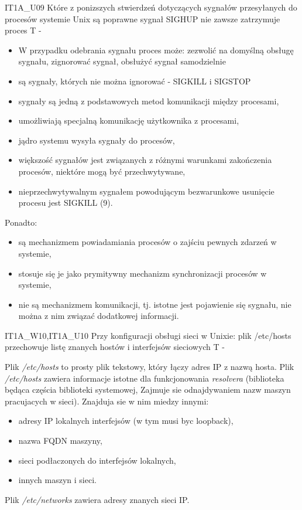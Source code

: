\answer
{IT1A\_U09 Które z ponizszych stwierdzeń dotyczących sygnałów przesyłanych do procesów systemie Unix są poprawne}
{sygnał SIGHUP nie zawsze zatrzymuje proces}
{T}
{-}
{
\begin{itemize}
\item W przypadku odebrania sygnału proces może: zezwolić na domyślną obsługę sygnału, zignorować sygnał, obsłużyć sygnał samodzielnie
\item są sygnały, których nie można ignorować - SIGKILL i SIGSTOP
\item sygnały są jedną z podstawowych metod komunikacji między procesami,
\item umożliwiają specjalną komunikację użytkownika z procesami,
\item jądro systemu wysyła sygnały do procesów,
\item większość sygnałów jest związanych z różnymi warunkami zakończenia procesów,
niektóre mogą być przechwytywane,
\item nieprzechwytywalnym sygnałem powodującym bezwarunkowe usunięcie procesu jest SIGKILL (9).
\end{itemize}
Ponadto:
\begin{itemize}
\item są mechanizmem powiadamiania procesów o zajściu pewnych zdarzeń w systemie,
\item stosuje się je jako prymitywny mechanizm synchronizacji procesów w systemie,
\item nie są mechanizmem komunikacji, tj. istotne jest pojawienie się sygnału, nie można z nim związać dodatkowej informacji.
\end{itemize}
}




\answer
{ IT1A\_W10,IT1A\_U10 Przy konfiguracji obsługi sieci w Unixie:}
{plik /etc/hosts przechowuje listę znanych hostów i interfejsów sieciowych}
{T}
{-}
{ Plik \textit{/etc/hosts} to prosty plik tekstowy, który łączy adres IP z nazwą hosta.
Plik \textit{/etc/hosts} zawiera informacje istotne dla funkcjonowania \textit{resolvera} (biblioteka będąca częścia biblioteki systemowej, Zajmuje sie
odnajdywaniem nazw maszyn pracujacych w sieci). Znajduja sie w nim miedzy innymi:
\begin{itemize}
\item adresy IP lokalnych interfejsów (w tym musi byc loopback),
\item nazwa FQDN maszyny,
\item  sieci podłaczonych do interfejsów lokalnych,
\item  innych maszyn i sieci.
\end{itemize}
Plik \textit{/etc/networks} zawiera adresy znanych sieci IP.
}